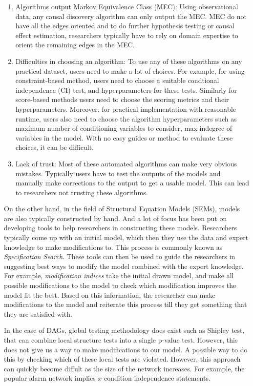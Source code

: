 \documentclass[letterpaper]{article} %
\begin{document}
\begin{enumerate}
	\item Algorithms output Markov Equivalence Class (MEC): Using observational
		data, any causal discovery algorithm can only output the MEC.
		MEC do not have all the edges oriented and to do further
		hypothesis testing or causal effect estimation, researchers
		typically have to rely on domain expertise to orient the
		remaining edges in the MEC.
	\item Difficulties in choosing an algorithm: To use any of these algorithms on 
		any practical dataset, users need to make a lot of choices. For
		example, for using constraint-based method, users need to
		choose a suitable condtional independence (CI) test, and
		hyperparameters for these tests. Similarly for score-based
		methods users need to choose the scoring metrics and their
		hyperparameters. Moreover, for practical implementation with
		reasonable runtime, users also need to choose the algorithm
		hyperparameters such as maximum number of conditioning
		variables to consider, max indegree of variables in the model. With
		no easy guides or method to evaluate these choices, it can be difficult.
	\item Lack of trust: Most of these automated algorithms can make very obvious 
		mistakes. Typically users have to test the outputs of the models and 
		manually make corrections to the output to get a usable model.
		This can lead to researchers not trusting these algorithms.
\end{enumerate}


On the other hand, in the field of Structural Equation Models (SEMs), models
are also typically constructed by hand. And a lot of focus has been put on
developing tools to help researchers in constructing these models. Researchers
typically come up with an initial model, which then they use the data and
expert knowledge to make modifications to. This process is commonly known as
\emph{Specification Search}. These tools can then be used to guide the
researchers in suggesting best ways to modify the model combined with the
expert knowledge. For example, \emph{modification indices} take the initial
drawn model, and make all possible modifications to the model to check which
modification improves the model fit the best. Based on this information, the
researcher can make modifications to the model and reiterate this process till
they get something that they are satisfied with.

In the case of DAGs, global testing methodology does exist such as Shipley
test, that can combine local structure tests into a single p-value test.
However, this does not give us a way to make modifications to our model. A
possible way to do this by checking which of these local tests are violated.
However, this approach can quickly become diffult as the size of the network
increases. For example, the popular alarm network implies $x$ condition independence
statements.
\end{document}
